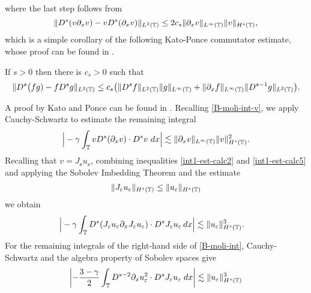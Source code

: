 %
%
%
where the last step follows from 
%
%
%
\begin{equation} \label{int1-est-calc3}
\| D^s(v\partial_x v)  -  v D^s (\partial_xv) \|_{L^2(\mathbb{T})}
\le
2 c_s    \| \partial_x v \|_{L^\infty(\mathbb{T})} \| v \|_{H^s(\mathbb{T})},
\end{equation}
%
%
which is a simple corollary of the following Kato-Ponce commutator 
estimate, whose proof can be found in \cite{Kato:1988zr}.
%
%
\begin{lemma} \label{KP-lemma}
If  $s>0$ then there is $c_s>0$ such that 
%
%
%
\begin{equation} \label{KP-com-est}
\| D^{s} \big(fg) -  f D^s g\|_{L^2(\mathbb{T})}
\le
c_s \big(
\| D^{s}f \|_{L^2(\mathbb{T})}    \| g \|_{L^\infty(\mathbb{T})} +
\| \partial_xf \|_{L^\infty(\mathbb{T})}    \| D^{s-1}g \|_{L^2(\mathbb{T})}   \big).
\end{equation}
%
%
%
\end{lemma}
%
%
A proof by Kato and Ponce can be found in \cite{Kato:1988zr}.
Recalling \eqref{B-moli-int-v}, we apply Cauchy-Schwartz
to estimate the remaining integral
%
%
%
%
%
\begin{equation} \label{int1-est-calc5}
\begin{split}
\Big|
-\gamma \int_{\mathbb{T}}
v D^s (\partial_x v)
\cdot  D^s v \ dx
\Big|
\lesssim \| \partial_x v \|_{L^\infty(\mathbb{T})} \| v \|_{H^s(\mathbb{T})}^2.
\end{split}
\end{equation}
%
%
%
%
%
Recalling that $v = J_\ee u_\ee$, combining inequalities  
\eqref{int1-est-calc2} and
\eqref{int1-est-calc5} and applying the Sobolev Imbedding Theorem and the 
estimate
%
%
\begin{equation*}
	\begin{split}
		\|J_\varepsilon u_\varepsilon \|_{H^s(\mathbb{T})} \le \|u_\varepsilon\|_{H^s(\mathbb{T})}	\end{split}
\end{equation*}
%
%
we obtain
%
%
%
\begin{equation} \label{burgers_est'}
\begin{split}
\Big|
-\gamma \int_{\mathbb{T}}
D^s(J_\varepsilon u_\varepsilon \partial_x J_\varepsilon u_\varepsilon) \cdot   D^s J_\varepsilon u_\varepsilon \, dx  
\Big|
& \lesssim \| u_\varepsilon \|_{H^s(\mathbb{T})}^3.
\end{split}
\end{equation}
%
%
%
For the remaining integrals of the right-hand side of \eqref{B-moli-int}, 
Cauchy-Schwartz and the algebra property of Sobolev spaces give 
%
%
\begin{equation}
\label{hl1}
\begin{split}
\left | - \frac{3 -\gamma}{2} \int_{\mathbb{T}} D^{s-2} \partial_x u_\varepsilon^2 \cdot
D^s J_\varepsilon u_\varepsilon \; dx \right |
\lesssim \| u_\varepsilon \|^3_{H^s(\mathbb{T})}
\end{split}
\end{equation}
